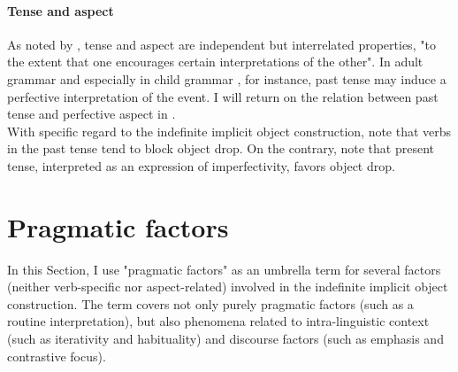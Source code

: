 \paragraph{Tense and aspect}
As noted by \textcite[68]{Medina2007}, tense and aspect are independent but interrelated properties, "to the extent that one encourages certain interpretations of the other". In adult grammar \parencite{comrie1976aspect} and especially in child grammar \parencite{wagner2001aspectual}, for instance, past tense may induce a perfective interpretation of the event. I will return on the relation between past tense and perfective aspect in .\\
With specific regard to the indefinite implicit object construction, \textcite{Dixon1992, Goldberg2005a, Glass2020} note that verbs in the past tense tend to block object drop. On the contrary, \textcite[9]{Garcia-VelascoMunoz2002} note that present tense, interpreted as an expression of imperfectivity, favors object drop.


\section{Pragmatic factors} 

In this Section, I use "pragmatic factors" as an umbrella term for several factors (neither verb-specific nor aspect-related) involved in the indefinite implicit object construction. The term covers not only purely pragmatic factors (such as a routine interpretation), but also phenomena related to intra-linguistic context (such as iterativity and habituality) and discourse factors (such as emphasis and contrastive focus).

